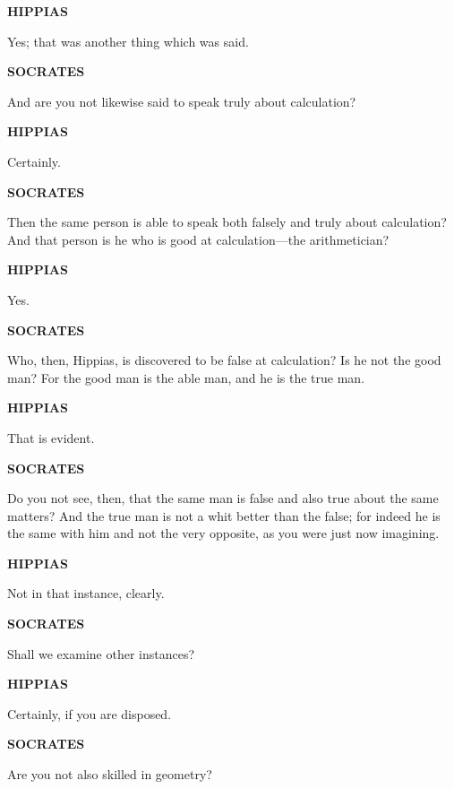\documentclass[11pt,letter]{article}
\begin{document}
\par \textbf{HIPPIAS}
\par   Yes; that was another thing which was said.

\par \textbf{SOCRATES}
\par   And are you not likewise said to speak truly about calculation?

\par \textbf{HIPPIAS}
\par   Certainly.

\par \textbf{SOCRATES}
\par   Then the same person is able to speak both falsely and truly about calculation? And that person is he who is good at calculation—the arithmetician?

\par \textbf{HIPPIAS}
\par   Yes.

\par \textbf{SOCRATES}
\par   Who, then, Hippias, is discovered to be false at calculation? Is he not the good man? For the good man is the able man, and he is the true man.

\par \textbf{HIPPIAS}
\par   That is evident.

\par \textbf{SOCRATES}
\par   Do you not see, then, that the same man is false and also true about the same matters? And the true man is not a whit better than the false; for indeed he is the same with him and not the very opposite, as you were just now imagining.

\par \textbf{HIPPIAS}
\par   Not in that instance, clearly.

\par \textbf{SOCRATES}
\par   Shall we examine other instances?

\par \textbf{HIPPIAS}
\par   Certainly, if you are disposed.

\par \textbf{SOCRATES}
\par   Are you not also skilled in geometry?
\end{document}
